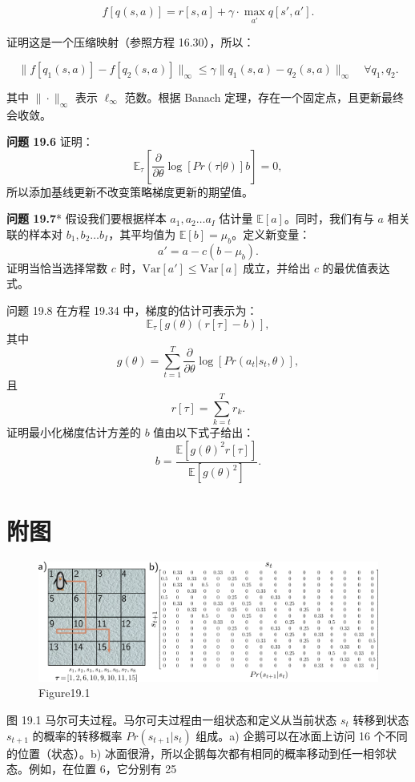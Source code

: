 \[
f[q(s, a)] = r[s, a] + \gamma \cdot \max_{a'} q[s', a']. \tag{19.46}
\]

证明这是一个压缩映射（参照方程 16.30），所以：

\[
\| f[q_1(s, a)] - f[q_2(s, a)] \|_{\infty} \leq \gamma \| q_1(s, a) - q_2(s, a) \|_{\infty} \quad \forall q_1, q_2. \tag{19.47}
\]

其中 \(\| \cdot \|_{\infty}\) 表示 \(\ell_{\infty}\) 范数。根据 Banach 定理，存在一个固定点，且更新最终会收敛。

\textbf{问题 19.6} 证明：
\[
\mathbb{E}_\tau \left[ \frac{\partial}{\partial \theta} \log[Pr(\tau|\theta)]b \right] = 0, \tag{19.48}
\]
所以添加基线更新不改变策略梯度更新的期望值。

\textbf{问题 19.7}* 假设我们要根据样本 \(a_1, a_2 \ldots a_I\) 估计量 \(\mathbb{E}[a]\)。同时，我们有与 \(a\) 相关联的样本对 \(b_1, b_2 \ldots b_I\)，其平均值为 \(\mathbb{E}[b] = \mu_b\)。定义新变量：
\[
a' = a - c(b - \mu_b). \tag{19.49}
\]
证明当恰当选择常数 \(c\) 时，\(\text{Var}[a'] \leq \text{Var}[a]\) 成立，并给出 \(c\) 的最优值表达式。

问题 19.8 在方程 19.34 中，梯度的估计可表示为：
\[
\mathbb{E}_\tau \left[ g(\theta)(r[\tau] - b) \right], \tag{19.50}
\]
其中
\[
g(\theta) = \sum_{t=1}^{T} \frac{\partial}{\partial \theta} \log[Pr(a_t|s_t, \theta)], \tag{19.51}
\]
且
\[
r[\tau] = \sum_{k=t}^{T} r_k. \tag{19.52}
\]
证明最小化梯度估计方差的 \(b\) 值由以下式子给出：
\[
b = \frac{\mathbb{E}[g(\theta)^2r[\tau]]}{\mathbb{E}[g(\theta)^2]}. \tag{19.53}
\]


\section{附图}
\begin{figure}[ht!]
\centering
\includegraphics[width=0.7\linewidth]{png/chapter19/ReinforceMDP.png}
\caption{Figure19.1}
\end{figure}
图 19.1 马尔可夫过程。马尔可夫过程由一组状态和定义从当前状态 \(s_t\) 转移到状态 \(s_{t+1}\) 的概率的转移概率 \(Pr(s_{t+1}|s_t)\) 组成。a) 企鹅可以在冰面上访问 16 个不同的位置（状态）。b) 冰面很滑，所以企鹅每次都有相同的概率移动到任一相邻状态。例如，在位置 6，它分别有 25%

